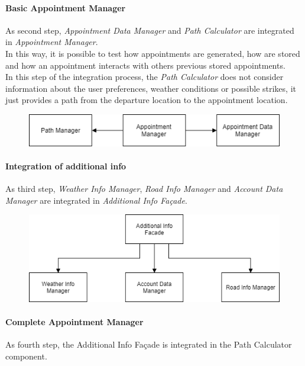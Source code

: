 \paragraph*{Basic Appointment Manager\\}
As second step, \emph{Appointment Data Manager} and \emph{Path Calculator} are integrated in \emph{Appointment Manager}.\\
In this way, it is possible to test how appointments are generated, how are stored and how an appointment interacts with others previous stored appointments.\\
In this step of the integration process, the \emph{Path Calculator} does not consider information about the user preferences, weather conditions or possible strikes, it just provides a path from the departure location to the appointment location.

\begin{figure}[H]
	\includegraphics[width=\textwidth, keepaspectratio=true]{Img/SecondStep}
\end{figure}


\paragraph*{Integration of additional info\\}
As third step, \emph{Weather Info Manager}, \emph{Road Info Manager} and \emph{Account Data Manager} are integrated in \emph{Additional Info Façade}.

\begin{figure}[H]
	\centering
	\includegraphics[width=\textwidth, keepaspectratio=true]{Img/ThirdStep}
\end{figure}

\paragraph*{Complete Appointment Manager\\}
As fourth step, the Additional Info Façade is integrated in the Path Calculator component.

